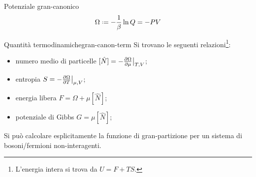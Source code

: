 \begin{definition}[before upper = {\tcbtitle}]{Potenziale gran-canonico}{}
	\begin{equation}
		\Omega \defeq - \frac{1}{\beta} \ln Q = - PV
	\end{equation}
\end{definition}

\begin{proposition}{Quantità termodinamiche}{gran-canon-term}
	Si trovano le seguenti relazioni\footnote{L'energia intera si trova da $ U = F + TS $.}:
	\begin{itemize}
		\item numero medio di particelle $ [\hat{N}] = - \frac{\partial \Omega}{\partial \mu}\big\vert_{T,V} $;
		\item entropia $ S = - \frac{\partial \Omega}{\partial T}\big\vert_{\mu,V} $;
		\item energia libera $ F = \Omega + \mu [\hat{N}] $;
		\item potenziale di Gibbs $ G = \mu [\hat{N}] $;
	\end{itemize}
\end{proposition}

Si può calcolare esplicitamente la funzione di gran-partizione per un sistema di bosoni/fermioni non-interagenti.

